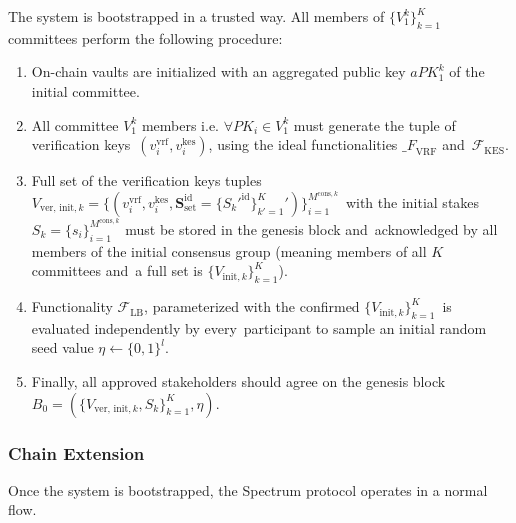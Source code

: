 The system is bootstrapped in a trusted way.
All members of $\{V^k_1\}_{k=1}^K$ committees perform the following procedure:
\begin{enumerate}
    \item On-chain vaults are initialized with an aggregated public key $aPK^k_1$ of the initial committee.

    \item All committee $V^k_1$ members i.e. ${\forall PK_i \in V^k_1}$ must generate the tuple of verification keys\
    ${(v_i^{\text{vrf}}, v_i^{\text{kes}})}$, using the ideal functionalities ${\mathcal_{F}}_{\text{VRF}}$ and\
    ${\mathcal{F}}_{\text{KES}}$.

    \item Full set of the verification keys tuples\
    ${V_{\text{ver, init}, k} = \{(v_i^{\text{vrf}}, v_i^{\text{kes}}, \mathbf{S}^{\text{id}}_{\text{set}} = \{S_k'^{\text{id}}\}_{k'=1}^K')\}_{i=1}^{M^{\text{cons}, k}}}$\
    with the initial stakes $S_k = \{s_i\}_{i=1}^{M^{\text{cons}, k}}$ must be stored in the genesis block and\
    acknowledged by all members of the initial consensus group (meaning members of all $K$ committees and\
    a full set is $\{V_{\text{init}, k}\}_{k=1}^{K}$).

    \item Functionality ${\mathcal{F}}_{\text{LB}}$, parameterized with the confirmed $\{V_{\text{init}, k}\}_{k=1}^{K}$\
    is evaluated independently by every\
    participant to sample an initial random seed value $\eta \leftarrow \{0, 1\}^l$.

    \item Finally, all approved stakeholders should agree on the genesis block\
    ${B_0=\left(\{V_{\text{ver, init}, k}, S_k\}_{k=1}^{K}, \eta\right)}$.
\end{enumerate}

\subsubsection{Chain Extension}\label{subsubsec:chain-extension}
Once the system is bootstrapped, the Spectrum protocol operates in a normal flow.

